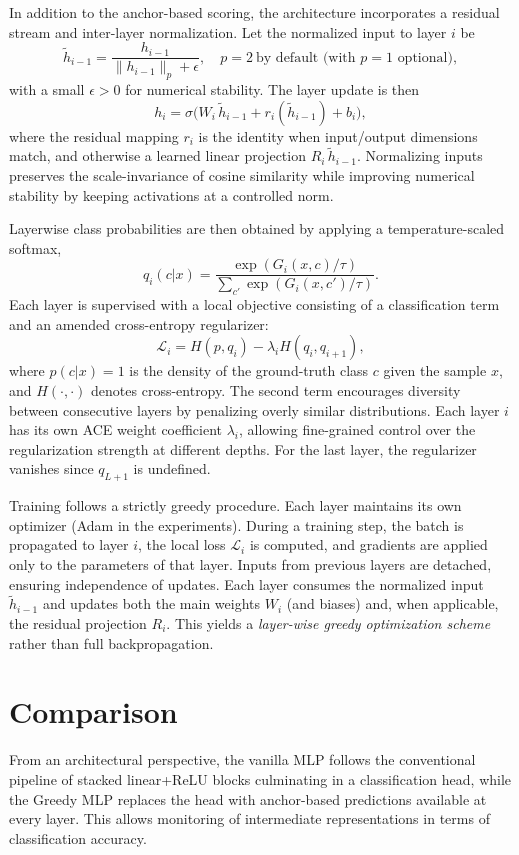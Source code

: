 \documentclass[11pt]{article}
\begin{document}
In addition to the anchor-based scoring, the architecture incorporates a residual stream and inter-layer normalization. Let the normalized input to layer $i$ be
\[
  \tilde{h}_{i-1} = \frac{h_{i-1}}{\|h_{i-1}\|_p + \epsilon},\quad p=2\ \text{by default (with $p=1$ optional)},
\]
with a small $\epsilon>0$ for numerical stability. The layer update is then
\[
  h_i = \sigma\big(W_i \, \tilde{h}_{i-1} + r_i(\tilde{h}_{i-1}) + b_i\big),
\]
where the residual mapping $r_i$ is the identity when input/output dimensions match, and otherwise a learned linear projection $R_i\,\tilde{h}_{i-1}$. Normalizing inputs preserves the scale-invariance of cosine similarity while improving numerical stability by keeping activations at a controlled norm.

Layerwise class probabilities are then obtained by applying a temperature-scaled softmax,
\[
  q_i(c|x) = \frac{\exp(G_i(x,c)/\tau)}{\sum_{c'} \exp(G_i(x,c')/\tau)}.
\]
Each layer is supervised with a local objective consisting of a classification term and an amended cross-entropy regularizer:
\[
  \mathcal{L}_i = H(p, q_i) - \lambda_i H(q_i, q_{i+1}),
\]
where $p(c|x)=1$ is the density of the ground-truth class $c$ given the sample $x$, and $H(\cdot,\cdot)$ denotes cross-entropy. The second term encourages diversity between consecutive layers by penalizing overly similar distributions. Each layer $i$ has its own ACE weight coefficient $\lambda_i$, allowing fine-grained control over the regularization strength at different depths. For the last layer, the regularizer vanishes since $q_{L+1}$ is undefined.

Training follows a strictly greedy procedure. Each layer maintains its own optimizer (Adam in the experiments). During a training step, the batch is propagated to layer $i$, the local loss $\mathcal{L}_i$ is computed, and gradients are applied only to the parameters of that layer. Inputs from previous layers are detached, ensuring independence of updates. Each layer consumes the normalized input $\tilde{h}_{i-1}$ and updates both the main weights $W_i$ (and biases) and, when applicable, the residual projection $R_i$. This yields a \emph{layer-wise greedy optimization scheme} rather than full backpropagation.

\section{Comparison}
From an architectural perspective, the vanilla MLP follows the conventional pipeline of stacked linear+ReLU blocks culminating in a classification head, while the Greedy MLP replaces the head with anchor-based predictions available at every layer. This allows monitoring of intermediate representations in terms of classification accuracy.
\end{document}
